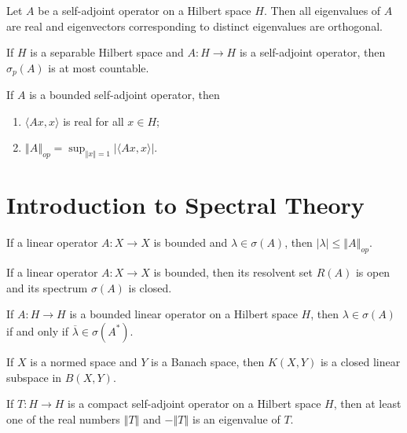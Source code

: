 \documentclass[a4paper]{article}
\newcommand{\norm}[1]{\left\Vert #1 \right\Vert}
\newcommand{\<}{\langle}
\renewcommand{\>}{\rangle}
\newcommand{\la}{\lambda}
\newcommand{\s}{\sigma}
\begin{document}
\begin{thm}
  Let $A$ be a self-adjoint operator on a Hilbert space $H$. Then all eigenvalues of $A$ are real and eigenvectors corresponding to distinct eigenvalues are orthogonal.
\end{thm}

\begin{prop}
  If $H$ is a separable Hilbert space and $A:H\to H$ is a self-adjoint operator, then $\s_p(A)$ is at most countable.
\end{prop}

\begin{thm}
  If $A$ is a bounded self-adjoint operator, then
  \begin{enumerate}
    \item $\<Ax,x\>$ is real for all $x\in H$;
    \item $\norm{A}_{op} = \sup_{\norm{x}=1}|\<Ax,x\>|$.
  \end{enumerate}
\end{thm}

\section{Introduction to Spectral Theory} 

\begin{prop}
  If a linear operator $A:X\to X$ is bounded and $\la\in\s(A)$, then $|\la|\leq\norm{A}_{op}$.
\end{prop}

\begin{prop}
  If a linear operator $A:X\to X$ is bounded, then its resolvent set $R(A)$ is open and its spectrum $\s(A)$ is closed.
\end{prop}

\begin{lemma}
  If $A:H\to H$ is a bounded linear operator on a Hilbert space $H$, then $\la\in\s(A)$ if and only if $\overline{\la}\in\s(A^*)$.
\end{lemma}

\begin{thm}
  If $X$ is a normed space and $Y$ is a Banach space, then $K(X,Y)$ is a closed linear subspace in $B(X,Y)$.
\end{thm}

\begin{lemma}
  If $T:H\to H$ is a compact self-adjoint operator on a Hilbert space $H$, then at least one of the real numbers $\norm{T}$ and $-\norm{T}$ is an eigenvalue of $T$.
\end{lemma}
\end{document}

